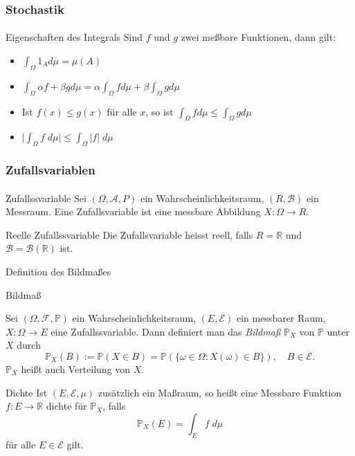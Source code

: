 \documentclass{beamer}
\begin{document}
\begin{frame}
    \frametitle{Stochastik}
\framesubtitle{}
\begin{block}{Eigenschaften des Integrals}
    Sind $f$ und $g$ zwei meßbare Funktionen, dann gilt:
    \begin{itemize}
        \item $\int_{\Omega} 1_A  d\mu  = \mu (A)$  
    \item $\int_{\Omega} \alpha f  + \beta g d\mu = \alpha \int_{\Omega}  f d\mu + \beta  \int_{\Omega}  g d\mu$
    \item Ist $f(x) \leq g(x)$ für alle $x$, so ist $\int_{\Omega} f d\mu \leq \int_{\Omega} g d\mu$ 
    \item $ \biggl | \int_{\Omega} f \; d\mu \biggr | \leq \int_{\Omega} |f| \; d\mu $
    \end{itemize}
    \end{block}
\end{frame}




\begin{frame}
    \frametitle{Zufallsvariablen}
\framesubtitle{}
\begin{block}{Zufallssvariable}
    Sei $(\Omega, \mathcal{A}, P)$ ein Wahrscheinlichkeitsraum, $(R, \mathcal{B})$ ein Messraum.
    Eine  Zufallsvariable ist eine messbare Abbildung  $X :  \Omega \to R$.
\end{block}
\begin{block}{Reelle Zufallssvariable}
    Die Zufallsvariable heisst reell, falls $R = \mathbb{R}$ und $\mathcal{B} = \mathcal{B}(\mathbb{R})$ ist.
\end{block} 
\end{frame}



\begin{frame}{Definition des Bildmaßes}
    \begin{block}{Bildmaß}

Sei
 $(\Omega,\mathcal{F},\mathbb{P})$ ein Wahrscheinlichkeitsraum,
    $(E,\mathcal{E})$ ein messbarer Raum,
    $X:\Omega\to E$ eine Zufallssvariable.  
  Dann definiert man das \emph{Bildmaß}  $\mathbb{P}_X$ von $\mathbb{P}$ unter $X$ durch
  \[
    \mathbb{P}_X(B) 
    := \mathbb{P}(X \in B) 
    = \mathbb{P}(\{\omega \in \Omega : X(\omega) \in B\}),
    \quad B \in \mathcal{E}.
  \]
  $ \mathbb{P}_X$ heißt auch Verteilung von $X$.
\end{block}
\begin{block}{Dichte}
    Ist
        $(E,\mathcal{E}, \mu)$ zusätzlich ein Maßraum, 
        so heißt eine Messbare Funktion 
        $f:E \to \mathbb{R}$ dichte für $\mathbb{P}_X$, falls  
      \[
        \mathbb{P}_X(E) = \int_E f \; d\mu
      \]
      für alle $E \in \mathcal{E}$ gilt.
    \end{block}

\end{frame}
\end{document}
